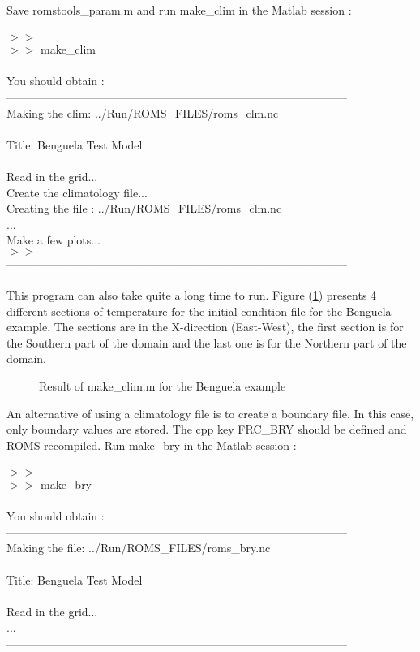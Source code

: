 Save romstools\_param.m and run make\_clim in the Matlab session :
\\ \\
$>>$\\
$>>$ make\_clim \\\\
You should obtain :\\
------------------------------------------------------------------------------------------\\
 Making the clim: ../Run/ROMS\_FILES/roms\_clm.nc \\
 \\
 Title: Benguela Test Model \\
 \\
 Read in the grid...
 \\
 Create the climatology file... \\
 Creating the file : ../Run/ROMS\_FILES/roms\_clm.nc\\
 ...\\ 
 Make a few plots...\\ 
 $>>$\\
------------------------------------------------------------------------------------------\\\\
This program can also take quite a long time to run.
Figure (\ref{fig:clim}) presents 4 different sections
of temperature for the initial condition file for the 
Benguela example. The sections are in the X-direction (East-West), 
the first section is for the Southern part of the domain and the last one 
is for the Northern part of the domain.
\begin{figure}[h!]
\centerline{}
\caption{Result of make\_clim.m for the Benguela example}
\label{fig:clim}
\end{figure}

An alternative of using a climatology file is to create a boundary 
file. In this case, only boundary values are stored. The cpp key
FRC\_BRY should be defined and ROMS recompiled. Run make\_bry in 
the Matlab session :
\\ \\
$>>$\\
$>>$ make\_bry \\\\
You should obtain :\\
------------------------------------------------------------------------------------------\\
 Making the file: ../Run/ROMS\_FILES/roms\_bry.nc \\
 \\
 Title: Benguela Test Model \\
 \\
 Read in the grid... \\
... \\
------------------------------------------------------------------------------------------\\

